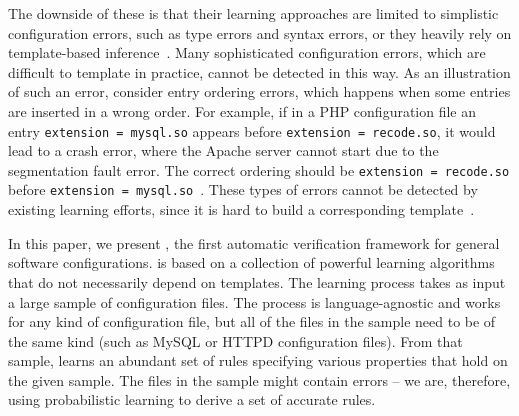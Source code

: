 The downside of these is that their learning approaches 
are limited to simplistic configuration errors, 
such as type errors and syntax errors, or they 
heavily rely on template-based inference~\cite{zhang14encore}. 
Many sophisticated configuration errors, 
which are difficult to template in practice, 
cannot be detected in this way. 
As an illustration of such an error, consider entry ordering errors, 
which happens when some entries are inserted in a wrong order. 
For example, if in a PHP configuration file 
an entry {\tt extension = mysql.so} appears 
before {\tt extension = recode.so},  
it would lead to a crash error, where the Apache server cannot start 
due to the segmentation fault error. The correct ordering 
should be {\tt extension = recode.so} before 
{\tt extension = mysql.so}~\cite{yin11anempirical}.
These types of errors cannot be detected by existing
learning efforts, 
since it is hard to build a corresponding template~\cite{xu15systems}. 



In this paper, we present \app, the first automatic verification framework
for general software configurations. \app is based on a collection of powerful learning 
algorithms that do not necessarily depend on templates. The learning process takes as input a
 large sample of configuration files. The process is language-agnostic and works for any kind of configuration file, 
but all of the files in the sample need to be of the same kind (such as
MySQL or HTTPD configuration files).
From that sample,
\app learns an abundant set of rules specifying various properties that hold on the given sample. The files in the sample might contain
errors -- we are, therefore, using probabilistic learning to derive a set of accurate rules. 

